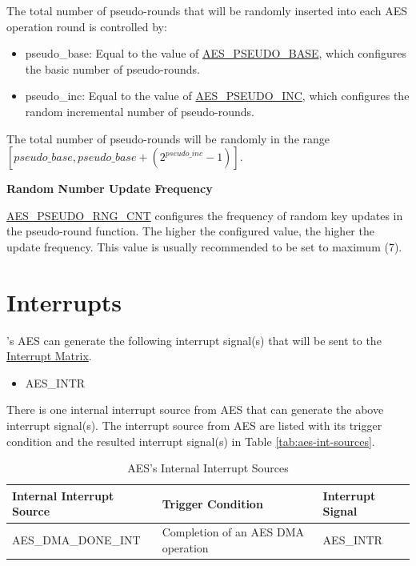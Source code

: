 \documentclass[main\_\_EN.tex]{subfiles}
\begin{document}
The total number of pseudo-rounds that will be randomly inserted into each AES operation round is controlled by:
\begin{itemize}
    \item pseudo\_base: Equal to the value of \hyperref[fielddesc:AESPSEUDOBASE]{AES\_PSEUDO\_BASE}, which configures the basic number of pseudo-rounds.
    \item pseudo\_inc: Equal to the value of \hyperref[fielddesc:AESPSEUDOINC]{AES\_PSEUDO\_INC}, which configures the random incremental number of pseudo-rounds.
\end{itemize}
The total number of pseudo-rounds will be randomly in the range $[pseudo\_base,pseudo\_base+(2^{pseudo\_inc}-1)]$.

\textbf{Random Number Update Frequency}

\hyperref[fielddesc:AESPSEUDORNGCNT]{AES\_PSEUDO\_RNG\_CNT} configures the frequency of random key updates in the pseudo-round function. The higher the configured value, the higher the update frequency. This value is usually recommended to be set to maximum (7).



\section{Interrupts}


\chipname{}'s AES can generate the following interrupt signal(s) that will be sent to the \hyperref[mod:intmtrx]{Interrupt Matrix}.

    \begin{itemize}
        \item AES\_INTR
    \end{itemize}

There is one internal interrupt source from AES that can generate the above interrupt signal(s). The interrupt source from AES are listed with its trigger condition and the resulted interrupt signal(s) in Table \ref{tab:aes-int-sources}.

\begin{longtable}{ | L{5cm} | L{6.5cm} | L{4cm} | }
\caption{AES's Internal Interrupt Sources} \label{tab:aes-int-sources}
\\ \hline
{}
\textbf{Internal Interrupt Source} & \textbf{Trigger Condition}  &  \textbf{Interrupt Signal}\\ \hline
\label{int:AESDMADONEINT}AES\_DMA\_DONE\_INT  &  Completion of an AES DMA operation &  AES\_INTR  \\ \hline
\end{longtable}
\end{document}
